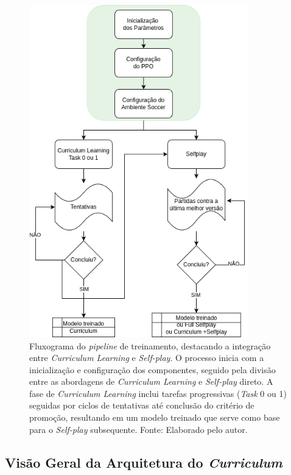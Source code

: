 \begin{figure}[H]
    \centering
    \includegraphics[width=0.85\textwidth]{fig/fluxograma_treino_mestrado.png}
    \caption{Fluxograma do \textit{pipeline} de treinamento, destacando a integração entre \textit{Curriculum Learning} e \textit{Self-play}. O processo inicia com a inicialização e configuração dos componentes, seguido pela divisão entre as abordagens de \textit{Curriculum Learning} e \textit{Self-play} direto. A fase de \textit{Curriculum Learning} inclui tarefas progressivas (\textit{Task} 0 ou 1) seguidas por ciclos de tentativas até conclusão do critério de promoção, resultando em um modelo treinado que serve como base para o \textit{Self-play} subsequente. Fonte: Elaborado pelo autor.}
    \label{fig:fluxograma_treino}
\end{figure}


\subsection{Visão Geral da Arquitetura do \textit{Curriculum}}

